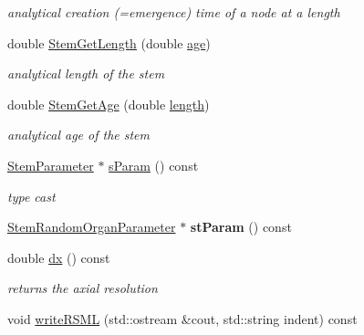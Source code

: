 \begin{DoxyCompactItemize}
\begin{DoxyCompactList}\small\item\em analytical creation (=emergence) time of a node at a length \end{DoxyCompactList}\item 
double \hyperlink{classCPlantBox_1_1Stem_a0c3ddde7bf9fb0441c7b95ad05347685}{Stem\+Get\+Length} (double \hyperlink{classCPlantBox_1_1Organ_a4f17f0bfe7f03eedf4138fd8fe51376d}{age})
\begin{DoxyCompactList}\small\item\em analytical length of the stem \end{DoxyCompactList}\item 
double \hyperlink{classCPlantBox_1_1Stem_a01e6785e387a9f3ed1e60a473fc051ce}{Stem\+Get\+Age} (double \hyperlink{classCPlantBox_1_1Organ_a94f5b16aa7ebc3912501051281fe88dc}{length})
\begin{DoxyCompactList}\small\item\em analytical age of the stem \end{DoxyCompactList}\item 
\mbox{\label{classCPlantBox_1_1Stem_af27ceeb09908f5f5aa9206403d277921}} 
\hyperlink{classCPlantBox_1_1StemParameter}{Stem\+Parameter} $\ast$ \hyperlink{classCPlantBox_1_1Stem_af27ceeb09908f5f5aa9206403d277921}{s\+Param} () const
\begin{DoxyCompactList}\small\item\em type cast \end{DoxyCompactList}\item 
\mbox{\label{classCPlantBox_1_1Stem_a8dbdde9f9cfc40c218095014bfbc6bdb}} 
\hyperlink{classCPlantBox_1_1StemRandomOrganParameter}{Stem\+Random\+Organ\+Parameter} $\ast$ {\bfseries st\+Param} () const
\item 
\mbox{\label{classCPlantBox_1_1Stem_a708d55df8fcf21bb006de2dce0093382}} 
double \hyperlink{classCPlantBox_1_1Stem_a708d55df8fcf21bb006de2dce0093382}{dx} () const
\begin{DoxyCompactList}\small\item\em returns the axial resolution \end{DoxyCompactList}\item 
void \hyperlink{classCPlantBox_1_1Stem_ae4087e7edf3b51619d6e8fd03a3c9ec8}{write\+R\+S\+ML} (std\+::ostream \&cout, std\+::string indent) const

\end{DoxyCompactItemize}
